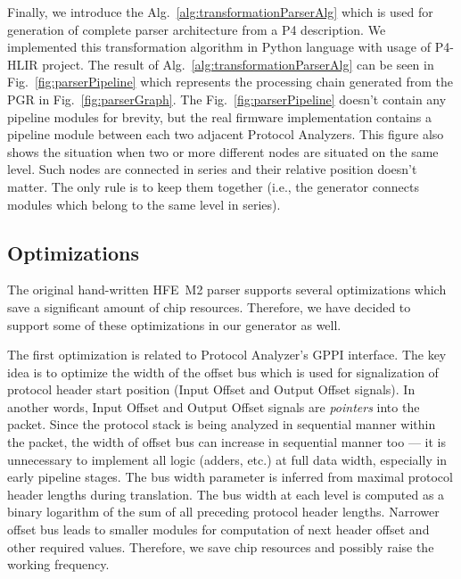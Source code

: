 Finally, we introduce the Alg.~\ref{alg:transformationParserAlg} which is used for generation of complete 
parser architecture from a P4 description.
We implemented this transformation algorithm in Python language with usage of P4-HLIR \cite{p4hlir} project. 
The result of Alg.~\ref{alg:transformationParserAlg} can be seen in Fig.~\ref{fig:parserPipeline} which represents 
the processing chain generated from the PGR in Fig.~\ref{fig:parserGraph}. 
The Fig.~\ref{fig:parserPipeline} doesn't contain any pipeline modules for brevity, but the real firmware implementation contains a pipeline 
module between each two adjacent Protocol Analyzers. 
This figure also shows the situation when two or more different nodes are situated on the same level. 
Such nodes are connected in series and their relative position doesn't matter.
The only rule is to keep them together (i.e., the generator connects modules which belong to the same level in series). 


\subsection{Optimizations}
\label{sec:optimizations}

The original hand-written HFE~M2 parser supports several optimizations which save a significant amount of chip resources. 
Therefore, we have decided to support some of these optimizations in our generator as well.

The first optimization is related to Protocol Analyzer's GPPI interface. The key idea is to optimize the width of the offset bus which is used for 
signalization of protocol header start position (Input Offset and Output Offset signals). 
In another words, Input Offset and Output Offset signals are \emph{pointers} into the packet.
Since the protocol stack is being analyzed in sequential manner within the packet, the width of offset bus can increase in sequential 
manner too --- it is unnecessary to implement 
all logic (adders, etc.) at full data width, especially in early pipeline stages. 
The bus width parameter is inferred from maximal protocol header lengths
during translation. The bus width at each level is computed as a binary logarithm of the sum of all preceding protocol header lengths.
Narrower offset bus leads to smaller modules for computation of next header offset and other required values.
Therefore, we save chip resources and possibly raise the working frequency.


